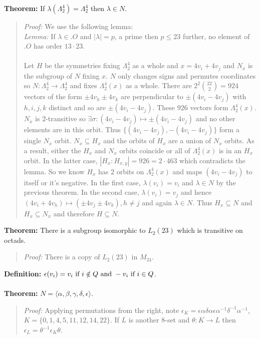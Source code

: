 {\bf Theorem:}
If $\lambda(\Lambda_2^4)= \Lambda_2^4$ then
$\lambda \in N$.
\begin{quote}
\emph{Proof:}
We use the following lemma:
\\
\emph{Lemma:} If $\lambda \in .O$ and $|\lambda|= p$, a prime then $p \le 23$ further,
no element of $.O$ has order $13 \cdot 23$.
\\
\\
Let $H$ be the symmetries fixing $\Lambda_2^4$ as a whole and $x= 4v_i +4v_j$
and $N_x$ is the subgroup of $N$ fixing $x$.  $N$ only changes signs and permutes
coordinates so $N: \Lambda_2^4 \rightarrow \Lambda_2^4$ and fixes
$\Lambda_2^4(x)$ as a whole.  There are $2^2 {22 \choose 2}= 924$ vectors
of the form $\pm 4 v_h \pm 4 v_k$ are perpendicular to 
$\pm(4 v_i - 4 v_j)$ with
$h, i, j,k$ distinct and so are
$\pm(4 v_i - 4 v_j)$.  These $926$ vectors form
$\Lambda_2^4(x)$.  $N_x$ is $2$-transitive so $\exists \sigma: 
(4 v_i - 4 v_j) \mapsto \pm (4 v_i - 4 v_j) $ and no other elements are in this orbit.
Thus $\{ (4 v_i - 4 v_j), -(4 v_i - 4 v_j) \} $ form a single $N_x$ orbit.
$N_x \subseteq H_x$ and the orbits of $H_x$ are a union of $N_x$ orbits.  As a result,
either the $H_x$ and $N_x$ orbits coincide or all of $\Lambda_2^4(x)$ is in an $H_x$ orbit.
In the latter case,
$|H_x: H_{x,y}| = 926= 2 \cdot 463$ which contradicts the lemma.
So we know $H_x$ has $2$ orbits on $\Lambda_2^4(x)$ and maps 
$(4 v_i - 4 v_j)$ to itself or it's negative.  In the first case, $\lambda(v_i)= v_i$ and
$\lambda \in N$ by the
previous theorem.  In the second case, $\lambda( v_i)= v_j$ and hence
$ (4 v_i + 4 v_h)  \mapsto (\pm 4 v_j \pm 4 v_k) , h \ne j $ and again $\lambda \in N$.  Thus
$H_x \subseteq N$ and $H_x \subseteq N_x$ and therefore $H \subseteq N$.
\end{quote}
{\bf Theorem:}
There is a subgroup isomorphic to $L_2(23)$ which is
transitive on octads. 
\begin{quote}
\emph{Proof:} 
There is a copy of $L_2(23)$ in $M_{24}$.
\end{quote}
{\bf Definition:} $\epsilon(v_i) = 
v_i \textnormal{ if } i \notin Q \textnormal{ and } -v_i \textnormal{ if } i \in Q $.
\\
\\
{\bf Theorem:} $N= \langle \alpha, \beta, \gamma, \delta, \epsilon \rangle$.
\begin{quote}
\emph{Proof:} 
Applying permutations from the right, note $\epsilon_K= 
\epsilon \alpha  \delta \alpha  \epsilon \alpha^{-1} \delta^{-1} \alpha^{-1}$, 
$K= \{ 0,1,4,5,11,12,14,22 \}$.  If $L$ is another $8$-set and $\theta: K \rightarrow L$ then
$\epsilon_L = \theta^{-1} \epsilon_K \theta$.
\end{quote}
